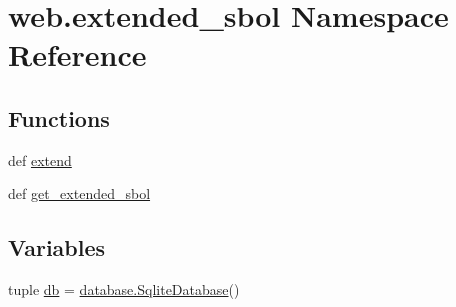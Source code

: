 \hypertarget{namespaceweb_1_1extended__sbol}{\section{web.\-extended\-\_\-sbol Namespace Reference}
\label{namespaceweb_1_1extended__sbol}
}
\subsection*{Functions}
\begin{DoxyCompactItemize}
\item 
def \hyperlink{namespaceweb_1_1extended__sbol_aeb20270634402fd5a2a4354c36d8d9ad}{extend}
\item 
def \hyperlink{namespaceweb_1_1extended__sbol_aa3bc7da3defcb7a028430f9a35345a82}{get\-\_\-extended\-\_\-sbol}
\end{DoxyCompactItemize}
\subsection*{Variables}
\begin{DoxyCompactItemize}
\item 
tuple \hyperlink{namespaceweb_1_1extended__sbol_afcf418a68aab4e432525941cc55447c0}{db} = \hyperlink{classweb_1_1database_1_1_sqlite_database}{database.\-Sqlite\-Database}()
\end{DoxyCompactItemize}


